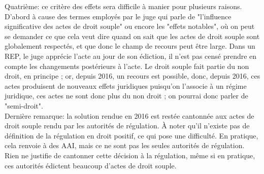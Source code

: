 \documentclass[10pt, a4paper, openany]{book}
\begin{document}
Quatrième: ce critère des effets sera difficile à manier pour plusieurs raisons. D'abord à cause des termes employés par le juge qui parle de "l'influence significative des actes de droit souple" ou encore les "effets notables", où on peut se demander ce que cela veut dire quand on sait que les actes de droit souple sont globalement respectés, et que donc le champ de recours peut être large. Dans un REP, le juge apprécie l'acte au jour de son édiction, il n'est pas censé prendre en compte les changements postérieurs à l'acte. Le droit souple fait partie du non droit, en principe ; or, depuis 2016, un recours est possible, donc, depuis 2016, ces actes produisent de nouveaux effets juridiques puisqu'on l'associe à un régime juridique, ces actes ne sont donc plus du non droit ; on pourrai donc parler de "semi-droit". \\
Dernière remarque: la solution rendue en 2016 est restée cantonnée aux actes de droit souple rendu par les autorités de régulation. À noter qu'il n'existe pas de définition de la régulation en droit positif, ce qui pose une difficulté. En pratique, cela renvoie à des AAI, mais ce ne sont pas les seules autorités de régulation. Rien ne justifie de cantonner cette décision à la régulation, même si en pratique, ces autorités édictent beaucoup d'actes de droit souple. 
\end{document}
